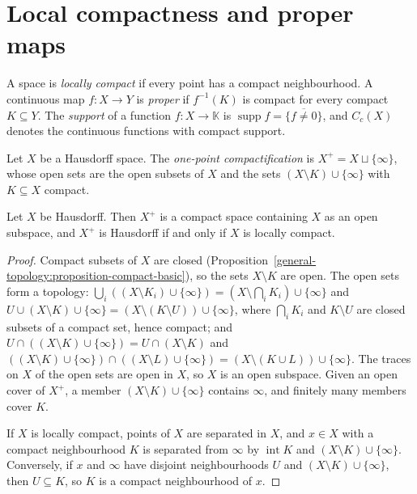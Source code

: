 \section{Local compactness and proper maps}\label{general-topology:section-local-compactness}

\begin{definition}\label{general-topology:definition-locally-compact}
A space is \emph{locally compact} if every point has a compact neighbourhood. A continuous map $f \colon X \to Y$ is \emph{proper} if $f^{-1}(K)$ is
compact for every compact $K \subseteq Y$. The \emph{support} of a function $f \colon X \to \mathbb{K}$ is $\operatorname{supp} f = \overline{\{f \neq 0\}}$, and
$C_c(X)$ denotes the continuous functions with compact support.
\end{definition}

\begin{definition}\label{general-topology:definition-one-point-compactification}
Let $X$ be a Hausdorff space. The \emph{one-point compactification} is $X^+ = X \sqcup \{\infty\}$, whose open sets are the open subsets of $X$ and the sets
$(X \setminus K) \cup \{\infty\}$ with $K \subseteq X$ compact.
\end{definition}

\begin{theorem}\label{general-topology:theorem-one-point-compactification}
Let $X$ be Hausdorff. Then $X^+$ is a compact space containing $X$ as an open subspace, and $X^+$ is Hausdorff if and only if $X$ is locally compact.
\end{theorem}

\begin{proof}
Compact subsets of $X$ are closed (Proposition~\ref{general-topology:proposition-compact-basic}), so the sets $X \setminus K$ are open. The open sets
form a topology: $\bigcup_i ((X \setminus K_i) \cup \{\infty\}) = (X \setminus \bigcap_i K_i) \cup \{\infty\}$ and
$U \cup (X \setminus K) \cup \{\infty\} = (X \setminus (K \setminus U)) \cup \{\infty\}$, where $\bigcap_i K_i$ and $K \setminus U$ are closed subsets of a
compact set, hence compact; and $U \cap ((X \setminus K) \cup \{\infty\}) = U \cap (X \setminus K)$ and
$((X \setminus K) \cup \{\infty\}) \cap ((X \setminus L) \cup \{\infty\}) = (X \setminus (K \cup L)) \cup \{\infty\}$. The traces on $X$ of the open sets
are open in $X$, so $X$ is an open subspace. Given an open cover of $X^+$, a member $(X \setminus K) \cup \{\infty\}$ contains $\infty$, and finitely many
members cover $K$.

If $X$ is locally compact, points of $X$ are separated in $X$, and $x \in X$ with a compact neighbourhood $K$ is separated from $\infty$ by
$\operatorname{int} K$ and $(X \setminus K) \cup \{\infty\}$. Conversely, if $x$ and $\infty$ have disjoint neighbourhoods $U$ and $(X \setminus K) \cup \{\infty\}$,
then $U \subseteq K$, so $K$ is a compact neighbourhood of $x$.
\end{proof}

